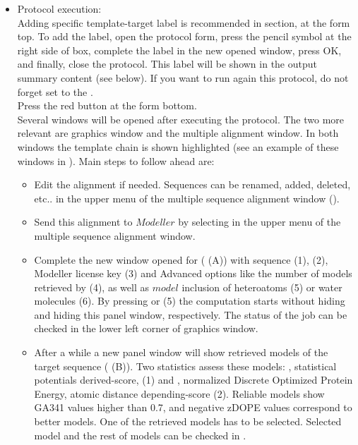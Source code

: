 \begin{itemize}
\begin{itemize}
  \end{itemize}
  \item Protocol execution:\\
  
  Adding specific template-target label is recommended in  section, at the form top. To add the label, open the protocol form, press the pencil symbol at the right side of  box, complete the label in the new opened window, press OK, and finally, close the protocol. This label will be shown in the output summary content (see below). If you want to run again this protocol, do not forget set to  the .\\
  Press the  red button at the form bottom.\\
  
  Several \chimera windows will be opened after executing the protocol. The two more relevant are \chimera graphics window and the multiple alignment window. In both windows the template chain is shown highlighted (see an example of these windows in ). Main steps to follow ahead are:\\
  \begin{itemize}
   \item Edit the alignment if needed. Sequences can be renamed, added, deleted, etc.. in the upper menu of the multiple sequence alignment window ().\\
   \item Send this alignment to $Modeller$ by selecting  in the upper menu of the multiple sequence alignment window.\\ 
   \item Complete the new window opened for  ( (A)) with  sequence (1),  (2), Modeller license key (3) and Advanced options like the number of models retrieved by \modeller (4), as well as $model$ inclusion of heteroatoms (5) or water molecules (6). By pressing  or  (5) the computation starts without hiding and hiding this panel window, respectively. The status of the job can be checked in the lower left corner of \chimera graphics window.\\
   \item After a while a new panel window will show retrieved models of the target sequence ( (B)). Two statistics assess these models: , statistical potentials derived-score, (1) and , normalized Discrete Optimized Protein Energy, atomic distance depending-score (2). Reliable models show GA341 values higher than 0.7, and negative zDOPE values correspond to better models. One of the retrieved models has to be selected. Selected model and the rest of models can be checked in \chimera {}.\\

\end{itemize}
\end{itemize}
